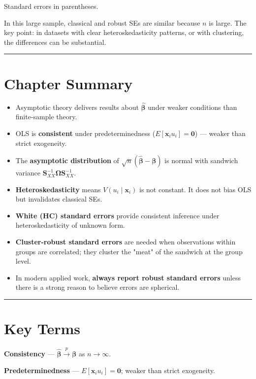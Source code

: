 Standard errors in parentheses.

In this large sample, classical and robust SEs are similar because $n$ is large. The key point: in datasets with clear heteroskedasticity patterns, or with clustering, the differences can be substantial.

\medskip\hrule\medskip

\section{Chapter Summary}

\begin{itemize}
\item Asymptotic theory delivers results about $\hat{\boldsymbol{\beta}}$ under weaker conditions than finite-sample theory.
\item OLS is \textbf{consistent} under predeterminedness ($E[\mathbf{x}_i u_i] = \mathbf{0}$) --- weaker than strict exogeneity.
\item The \textbf{asymptotic distribution} of $\sqrt{n}(\hat{\boldsymbol{\beta}} - \boldsymbol{\beta})$ is normal with sandwich variance $\mathbf{S}_{XX}^{-1}\boldsymbol{\Omega}\mathbf{S}_{XX}^{-1}$.
\item \textbf{Heteroskedasticity} means $V(u_i \mid \mathbf{x}_i)$ is not constant. It does not bias OLS but invalidates classical SEs.
\item \textbf{White (HC) standard errors} provide consistent inference under heteroskedasticity of unknown form.
\item \textbf{Cluster-robust standard errors} are needed when observations within groups are correlated; they cluster the "meat" of the sandwich at the group level.
\item In modern applied work, \textbf{always report robust standard errors} unless there is a strong reason to believe errors are spherical.
\end{itemize}

\medskip\hrule\medskip

\section{Key Terms}

\textbf{Consistency} --- $\hat{\boldsymbol{\beta}} \xrightarrow{p} \boldsymbol{\beta}$ as $n \to \infty$.

\textbf{Predeterminedness} --- $E[\mathbf{x}_i u_i] = \mathbf{0}$; weaker than strict exogeneity.

